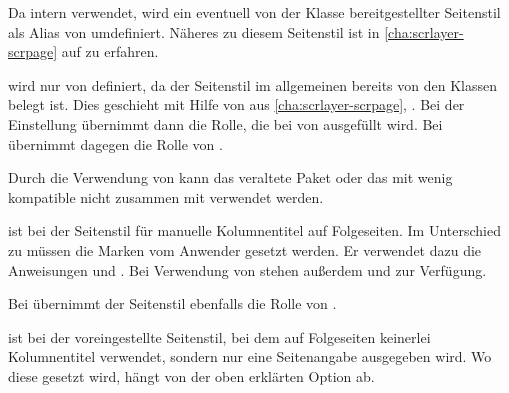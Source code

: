 \begin{description}
  Da  intern
  \hyperref[cha:scrlayer-scrpage]{} verwendet, wird
  ein eventuell von der Klasse bereitgestellter Seitenstil
   als Alias von
   umdefiniert. Näheres zu
  diesem Seitenstil ist in \autoref{cha:scrlayer-scrpage} auf
   zu erfahren.
\item[{\PageStyle{letter}}] %
  wird nur von  definiert, da der
  Seitenstil  im allgemeinen bereits von den Klassen
  belegt ist. Dies geschieht mit Hilfe von
  \hyperref[cha:scrlayer-scrpage]{} aus
  \autoref{cha:scrlayer-scrpage}, . Bei der
  Einstellung %
   übernimmt  dann die Rolle, die bei
   von  ausgefüllt
  wird. Bei %
   übernimmt  dagegen die Rolle von
  .
  
  Durch die Verwendung von
  \hyperref[cha:scrlayer-scrpage]{} kann das
  veraltete Paket  oder das mit
  \KOMAScript{} wenig kompatible %
   nicht zusammen mit
   verwendet werden.
\item[{\PageStyle{myheadings}}] %
  ist bei  der Seitenstil für
  manuelle Kolumnentitel auf Folgeseiten. Im Unterschied zu 
  müssen die Marken vom Anwender gesetzt werden. Er verwendet dazu die
  Anweisungen  und
  . Bei Verwendung von
  \hyperref[cha:scrlayer-scrpage]{} stehen außerdem
   und
   zur
  Verfügung.

  Bei  übernimmt der
  Seitenstil  ebenfalls die Rolle von
  .
\item[{\PageStyle{plain}}]
  ist bei 
  der voreingestellte Seitenstil, bei dem auf Folgeseiten keinerlei
  Kolumnentitel verwendet, sondern nur eine Seitenangabe ausgegeben wird. Wo
  diese gesetzt wird, hängt von der oben erklärten Option
   ab.


\end{description}
